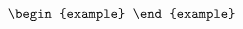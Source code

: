 \documentclass[aos,preprint]{imsart}
\begin{document}
\begin{equation}
\begin{example}
%


\iffalse
For large enough $p$,
\begin{align*}
	\bigtr{\Sigma^{(2)} \hat{\Sigma}^{-1}} &\rightarrow \frac{1}{n_1 + n_2} \bigtr{\Sigma^{(2)} (a_1 \Sigma^{(1)} + a_2 \Sigma^{(2)})^{-1}}
	= \frac{1}{n_1 + n_2} \bigtr{(a_1 M^{\top} M + a_2 \id)^{-1}}.
\end{align*}
Hence the variance limit depends on the spectrum of $M$. %
\fi


\end{example}
\end{equation}
\end{document}
